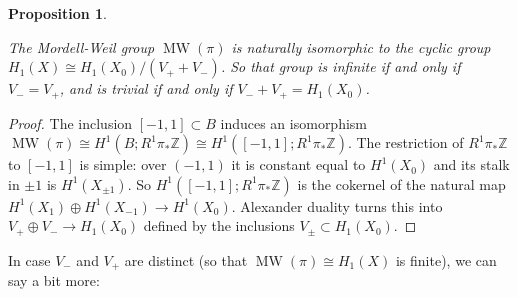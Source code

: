 \documentclass[10pt,letterpaper]{amsart}
\numberwithin{equation}{section}
\def\ZZ{{\mathbb Z}}
\newcommand\MW{\operatorname{MW}}
\newtheorem{proposition}[theorem]{Proposition}
\theoremstyle{remark}
\begin{document}
\begin{proposition}\label{prop:dichotomy}

The Mordell-Weil group $\MW(\pi)$ is naturally isomorphic to the cyclic group $H_1(X)\cong H_1(X_0)/(V_++V_-)$. So that group 
is infinite if and only if $ V_-=V_+$, and is  trivial  if and only if 
$V_-+V_+=H_1(X_0)$. 
\end{proposition}
\begin{proof}The inclusion $[-1,1]\subset B$ induces an isomorphism $\MW(\pi)\cong H^1(B; R^1\pi_*\ZZ)\cong H^1([-1,1]; R^1\pi_{*}\ZZ)$.
The restriction of   $R^1\pi_{*}\ZZ$ to $[-1,1]$ is  simple: over $(-1,1)$ it is constant equal to $H^1(X_0)$ and its stalk in  $\pm 1$ is $H^1(X_{\pm 1})$. So $H^1([-1,1]; R^1\pi_{*}\ZZ)$ is the cokernel of the natural map 
 $H^1(X_{1})\oplus H^1(X_{-1})\to H^1(X_0)$.  Alexander duality turns this  into  $V_+\oplus V_-\to H_1(X_0)$ defined by the inclusions $V_\pm\subset H_1(X_0)$.
\end{proof}

In case $V_-$ and $V_+$ are distinct  (so that $\MW(\pi)\cong H_1(X)$ is finite), we can say a bit more:
\end{document}
